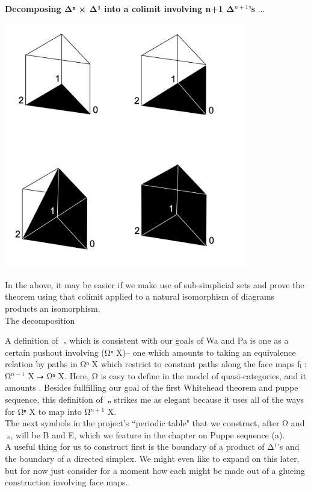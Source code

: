 \documentclass{book}
\theoremstyle{definition}
\begin{document}
{\bf Decomposing Δⁿ × Δ¹ into a colimit involving n+1 Δ${}^{n+1}$'s} ...

\begin{center}
\includegraphics[width=300pt]{prismfilling.png}
\end{center}

In the above, it may be easier if we make use of sub-simplicial sets and prove the theorem using that colimit applied to a natural isomorphism of diagrams products an isomorphism.\\

The decomposition 

A definition of π⃗ₙ which is consistent with our goals of Wa and Pa is one as a certain pushout involving (Ω⃗ⁿ X)-- one which amounts to taking an equivalence relation by paths in Ω⃗ⁿ X which restrict to constant paths along the face maps fᵢ : Ω⃗${}^{n-1}$ X ⭢ Ω⃗ⁿ X. Here, Ω⃗ is easy to define in the model of quasi-categories, and it amounts . Besides fullfilling our goal of the first Whitehead theorem and puppe sequence, this definition of π⃗ₙ strikes me as elegant because it uses all of the ways for Ω⃗ⁿ X to map into Ω⃗${}^{n+1}$ X.\\

The next symbols in the project's ``periodic table" that we construct, after Ω⃗ and π⃗ₙ, will be B⃗ and E⃗, which we feature in the chapter on Puppe sequence (a).\\

A useful thing for us to construct first is the boundary of a product of Δ¹'s and the boundary of a directed simplex. We might even like to expand on this later, but for now just consider for a moment how each might be made out of a glueing construction involving face maps.\\
\end{document}
